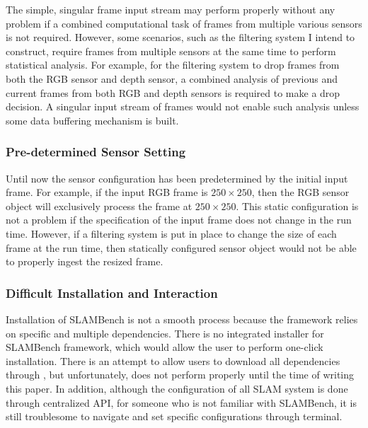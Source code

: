 The simple, singular frame input stream may perform properly without any problem if a combined computational task of frames from multiple various sensors is not required.  
However, some scenarios, such as the filtering system I intend to construct, require frames from multiple sensors at the same time to perform statistical analysis. 
For example, for the filtering system to drop frames from both the RGB sensor and depth sensor, a combined analysis of previous and current frames from both RGB and depth sensors is required to make a drop decision. 
A singular input stream of frames would not enable such analysis unless some data buffering mechanism is built.

\subsubsection*{Pre-determined Sensor Setting}

Until now the sensor configuration has been predetermined by the initial input frame. 
For example, if the input RGB frame is $250 \times 250$, then the RGB sensor object will exclusively process the frame at $250 \times 250$. 
This static configuration is not a problem if the specification of the input frame does not change in the run time. 
However, if a filtering system is put in place to change the size of each frame at the run time, then statically configured sensor object would not be able to properly ingest the resized frame.

\subsubsection*{Difficult Installation and Interaction}
Installation of SLAMBench is not a smooth process because the framework relies on specific and multiple dependencies. 
There is no integrated installer for SLAMBench framework, which would allow the user to perform one-click installation. 
There is an attempt to allow users to download all dependencies through , but unfortunately,  does not perform properly until the time of writing this paper. 
In addition, although the configuration of all SLAM system is done through centralized API, for someone who is not familiar with SLAMBench, it is still troublesome to navigate and set specific configurations through terminal.

